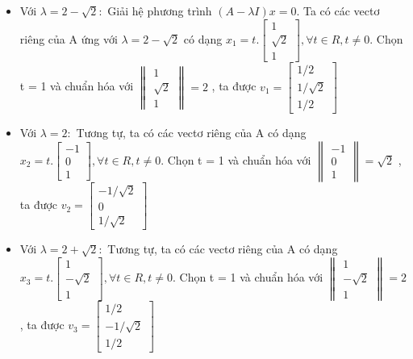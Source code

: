 \documentclass{article}
\begin{document}
\begin{itemize}
    \item Với \( \lambda = 2-\sqrt{2}: \)
          \newline Giải hệ phương trình \( (A - \lambda I)x = 0. \)
          Ta có các vectơ riêng của A ứng với \( \lambda = 2-\sqrt2\) có dạng
          \( x_1 = t.\begin{bmatrix} 1 \\ \sqrt{2} \\ 1 \end{bmatrix}
          ,\forall t \in R, t \neq 0. \)
          \newline Chọn t = 1 và chuẩn hóa với \( \begin{Vmatrix} 1 \\ \sqrt2 \\ 1 \end{Vmatrix}
          = 2 \) , ta được
          \(v_1 = \begin{bmatrix} 1/2 \\ 1/ \sqrt2 \\ 1/2 \end{bmatrix}\)
    \item Với \( \lambda = 2: \)
          \newline Tương tự, ta có các vectơ riêng của A có dạng
          \( x_2 = t.\begin{bmatrix}
              -1 \\ 0 \\ 1
          \end{bmatrix} ,\forall t \in R, t \neq 0. \)
          \newline Chọn t = 1 và chuẩn hóa với \( \begin{Vmatrix} -1 \\ 0 \\ 1 \end{Vmatrix}
          = \sqrt2 \) , ta được
          \(v_2 = \begin{bmatrix} -1/ \sqrt2 \\ 0 \\ 1/ \sqrt2 \end{bmatrix}\)
    \item Với \( \lambda = 2+\sqrt2: \)
          \newline Tương tự, ta có các vectơ riêng của A có dạng
          \( x_3 = t.\begin{bmatrix}
              1 \\ - \sqrt2 \\ 1
          \end{bmatrix} ,\forall t \in R, t \neq 0. \)
          \newline Chọn t = 1 và chuẩn hóa với \( \begin{Vmatrix} 1 \\ - \sqrt2 \\ 1 \end{Vmatrix}
          = 2 \) , ta được
          \(v_3 = \begin{bmatrix} 1/2 \\ -1/ \sqrt2 \\ 1/2 \end{bmatrix}\)
\end{itemize}
\end{document}
